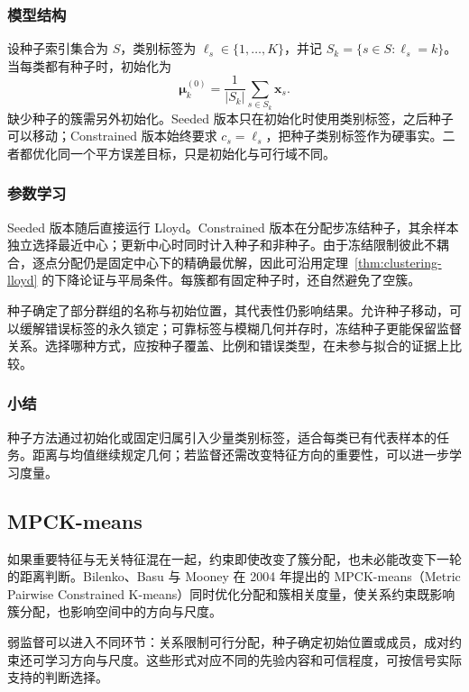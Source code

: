 \subsubsection{模型结构}

设种子索引集合为 $S$，类别标签为 $\ell_s\in\{1,\ldots,K\}$，并记 $S_k=\{s\in S:\ell_s=k\}$。当每类都有种子时，初始化为
\[
 \bm{\mu}_k^{(0)}
 =\frac{1}{|S_k|}\sum_{s\in S_k}\bm{x}_s.
\]
缺少种子的簇需另外初始化。Seeded 版本只在初始化时使用类别标签，之后种子可以移动；Constrained 版本始终要求 $c_s=\ell_s$，把种子类别标签作为硬事实。二者都优化同一个平方误差目标，只是初始化与可行域不同。

\subsubsection{参数学习}

Seeded 版本随后直接运行 Lloyd。Constrained 版本在分配步冻结种子，其余样本独立选择最近中心；更新中心时同时计入种子和非种子。由于冻结限制彼此不耦合，逐点分配仍是固定中心下的精确最优解，因此可沿用定理~\ref{thm:clustering-lloyd} 的下降论证与平局条件。每簇都有固定种子时，还自然避免了空簇。

种子确定了部分群组的名称与初始位置，其代表性仍影响结果。允许种子移动，可以缓解错误标签的永久锁定；可靠标签与模糊几何并存时，冻结种子更能保留监督关系。选择哪种方式，应按种子覆盖、比例和错误类型，在未参与拟合的证据上比较。

\subsubsection{小结}

种子方法通过初始化或固定归属引入少量类别标签，适合每类已有代表样本的任务。距离与均值继续规定几何；若监督还需改变特征方向的重要性，可以进一步学习度量。

\subsection{MPCK-means}
\label{sec:clustering-mpck}

如果重要特征与无关特征混在一起，约束即使改变了簇分配，也未必能改变下一轮的距离判断。Bilenko、Basu 与 Mooney 在 2004 年提出的 MPCK-means（Metric Pairwise Constrained K-means）同时优化分配和簇相关度量，使关系约束既影响簇分配，也影响空间中的方向与尺度。

弱监督可以进入不同环节：关系限制可行分配，种子确定初始位置或成员，成对约束还可学习方向与尺度。这些形式对应不同的先验内容和可信程度，可按信号实际支持的判断选择。

